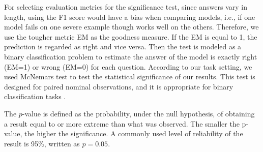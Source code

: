 \documentclass[letterpaper]{article} %
\begin{document}
For selecting evaluation metrics for the significance test, since answers vary in length, using the F1 score would have a bias when comparing models, i.e., if one model fails on one severe example though works well on the others. Therefore, we use the tougher metric EM as the goodness measure. If the EM is equal to 1, the prediction is regarded as right and vice versa. Then the test is modeled as a binary classification problem to estimate the answer of the model is exactly right (EM=1) or wrong (EM=0) for each question. According to our task setting, we used McNemars test \cite{mcnemar1947note} to test the statistical significance of our results. This test is designed for paired nominal observations, and it is appropriate for binary classification tasks \cite{ziser2016neural}.





The $p$-value is defined as the probability, under the null hypothesis, of obtaining a result equal to or more extreme than what was observed. The smaller the p-value, the higher the significance. A commonly used level of reliability of the result is 95\%, written as $p=0.05$.
\end{document}

